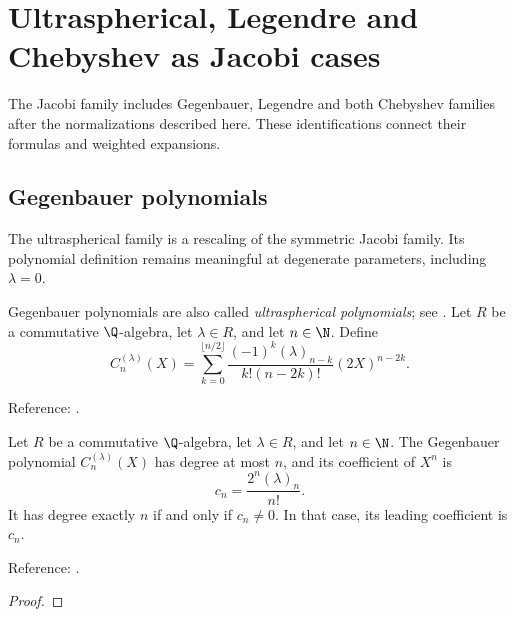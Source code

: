 \chapter{Ultraspherical, Legendre and Chebyshev as Jacobi cases}\label{chap:classical}


The Jacobi family includes Gegenbauer, Legendre and both Chebyshev families after the normalizations described here. These identifications connect their formulas and weighted expansions.

\section{Gegenbauer polynomials}\label{sec:textbook-classical-gegenbauer}

The ultraspherical family is a rescaling of the symmetric Jacobi family. Its polynomial definition remains meaningful at degenerate parameters, including $\lambda=0$.

\begin{definition}
\label{def:gegenbauer}
\leanok
Gegenbauer polynomials are also called \emph{ultraspherical polynomials};
see \cite[\S18.1(ii)]{dlmf}.
Let $R$ be a commutative $\Q$-algebra, let $\lambda\in R$, and let $n\in\N$. Define
\[C_n^{(\lambda)}(X)=\sum_{k=0}^{\lfloor n/2\rfloor}
 \frac{(-1)^k(\lambda)_{n-k}}{k!(n-2k)!}(2X)^{n-2k}.\]

Reference: \cite[18.5.10]{dlmf}.
\end{definition}

\begin{theorem}
\label{thm:gegenbauer-degree}
\leanok
Let $R$ be a commutative $\Q$-algebra, let $\lambda\in R$, and let $n\in\N$.
The Gegenbauer polynomial $C_n^{(\lambda)}(X)$ has degree at most $n$, and its coefficient of $X^n$ is
\[
 c_n=\frac{2^n(\lambda)_n}{n!}.
\]
It has degree exactly $n$ if and only if $c_n\ne0$. In that case, its leading coefficient is $c_n$.

Reference: \cite[Table 18.3.1]{dlmf}.
\end{theorem}
\begin{proof}
\leanok
\end{proof}

